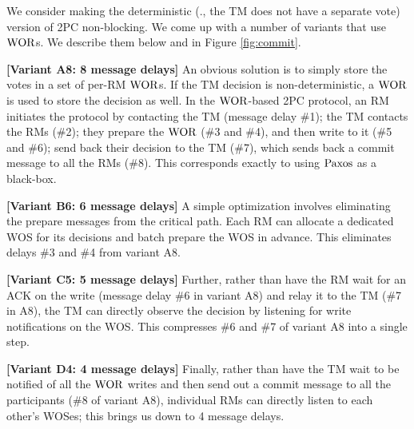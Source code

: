 We consider making the deterministic (\ie., the TM does not have a separate vote) version of 2PC non-blocking. 
We come up with a number of variants that use $\mathrm{WOR}$s. We describe them below and in Figure \ref{fig:commit}.

\textbf{[Variant A8: 8 message delays]} An obvious solution is to simply store the votes in a set of per-RM $\mathrm{WOR}$s. 
If the TM decision is non-deterministic, a $\mathrm{WOR}$ is used to store the decision as well. In the $\mathrm{WOR}$-based 2PC protocol, 
an RM initiates the protocol by contacting the TM (message delay \#1); the TM contacts the RMs (\#2); 
they prepare the $\mathrm{WOR}$ (\#3 and \#4), and then write to it (\#5 and \#6); send back their decision to the TM (\#7), 
which sends back a commit message to all the RMs (\#8). This corresponds exactly to using $\mathrm{Paxos}$ as a black-box.


\textbf{[Variant B6: 6 message delays]} A simple optimization involves eliminating the prepare messages from the critical path. 
Each RM can allocate a dedicated WOS for its decisions and batch prepare the WOS in advance. 
This eliminates delays \#3 and \#4 from variant A8.%


\textbf{[Variant C5: 5 message delays]} Further, rather than have the RM wait for an ACK on the write (message delay \#6 in variant A8) and 
relay it to the TM (\#7 in A8), the TM can directly observe the decision by listening for write notifications on the WOS. 
This compresses \#6 and \#7 of variant A8 into a single step.


\textbf{[Variant D4: 4 message delays]} Finally, rather than have the TM wait to be notified of all the $\mathrm{WOR}$ 
writes and then send out a commit message to all the participants (\#8 of variant A8), 
individual RMs can directly listen to each other's WOSes; this brings us down to 4 message delays.



